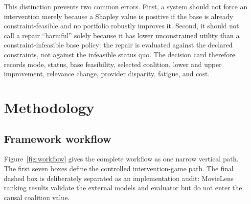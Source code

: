 \documentclass[pdflatex,sn-mathphys-num]{sn-jnl}
\theoremstyle{thmstyleone}
\theoremstyle{thmstyletwo}
\theoremstyle{thmstylethree}
\begin{document}
This distinction prevents two common errors. First, a system should not force an intervention merely because a Shapley value is positive if the base is already constraint-feasible and no portfolio robustly improves it. Second, it should not call a repair ``harmful'' solely because it has lower unconstrained utility than a constraint-infeasible base policy: the repair is evaluated against the declared constraints, not against the infeasible status quo. The decision card therefore records mode, status, base feasibility, selected coalition, lower and upper improvement, relevance change, provider disparity, fatigue, and cost.

\section{Methodology}\label{sec:method}

\subsection{Framework workflow}

Figure~\ref{fig:workflow} gives the complete workflow as one narrow vertical path. The first seven boxes define the controlled intervention-game path. The final dashed box is deliberately separated as an implementation audit: MovieLens ranking results validate the external models and evaluator but do not enter the causal coalition value.
\end{document}
